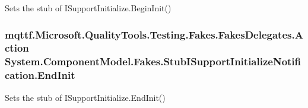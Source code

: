 Sets the stub of I\-Support\-Initialize.\-Begin\-Init()

\hypertarget{class_system_1_1_component_model_1_1_fakes_1_1_stub_i_support_initialize_notification_af8bc513a8d557675185f9abcb19bae49}{
\subsubsection[{End\-Init}]{\setlength{\rightskip}{0pt plus 5cm}mqttf.\-Microsoft.\-Quality\-Tools.\-Testing.\-Fakes.\-Fakes\-Delegates.\-Action System.\-Component\-Model.\-Fakes.\-Stub\-I\-Support\-Initialize\-Notification.\-End\-Init}}\label{class_system_1_1_component_model_1_1_fakes_1_1_stub_i_support_initialize_notification_af8bc513a8d557675185f9abcb19bae49}


Sets the stub of I\-Support\-Initialize.\-End\-Init()

